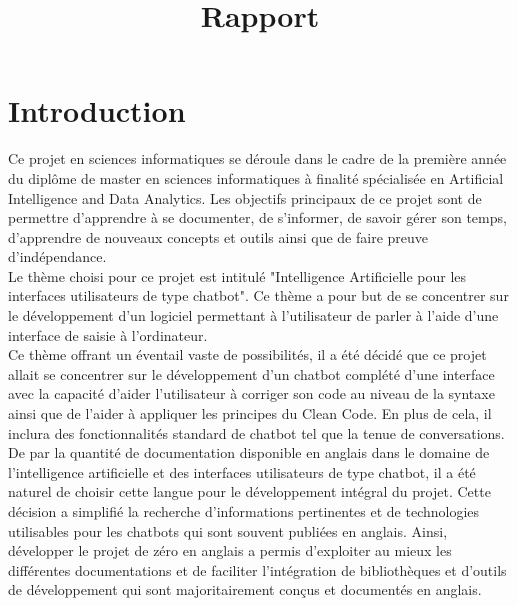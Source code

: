 \documentclass{rapport}
\title{Rapport} %
\begin{document}



       
\fairemarges %
\fairepagedegarde %
\tabledematieres %



\section{Introduction} 
Ce projet en sciences informatiques se déroule dans le cadre de la première année du diplôme de master en sciences informatiques à finalité spécialisée en Artificial Intelligence and Data Analytics. Les objectifs principaux de ce projet sont de permettre d'apprendre à se documenter, de s'informer, de savoir gérer son temps, d'apprendre de nouveaux concepts et outils ainsi que de faire preuve d'indépendance.\\

Le thème choisi pour ce projet est intitulé "Intelligence Artificielle pour les interfaces utilisateurs de type chatbot". Ce thème a pour but de se concentrer sur le développement d'un logiciel permettant à l'utilisateur de parler à l'aide d'une interface de saisie à l'ordinateur.\\

Ce thème offrant un éventail vaste de possibilités, il a été décidé que ce projet allait se concentrer sur le développement d'un chatbot complété d'une interface avec la capacité d'aider l'utilisateur à corriger son code au niveau de la syntaxe ainsi que de l'aider à appliquer les principes du Clean Code. En plus de cela, il inclura des fonctionnalités standard de chatbot tel que la tenue de conversations.\\

De par la quantité de documentation disponible en anglais dans le domaine de l'intelligence artificielle et des interfaces utilisateurs de type chatbot, il a été naturel de choisir cette langue pour le développement intégral du projet. Cette décision a simplifié la recherche d'informations pertinentes et de technologies utilisables pour les chatbots qui sont souvent publiées en anglais. Ainsi, développer le projet de zéro en anglais a permis d'exploiter au mieux les différentes documentations et de faciliter l'intégration de bibliothèques et d'outils de développement qui sont majoritairement conçus et documentés en anglais.\\
\end{document}
